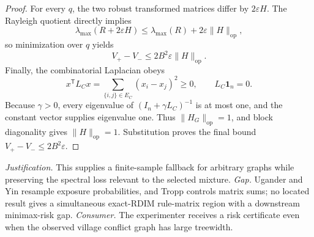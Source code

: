 \documentclass{article}
\begin{document}
\begin{proof}
For every \(q\), the two robust transformed matrices differ by \(2\varepsilon H\).  The Rayleigh quotient directly implies
\[
 \lambda_{\max}(R+2\varepsilon H)
 \le\lambda_{\max}(R)+2\varepsilon\|H\|_{\mathrm{op}},
\]
so minimization over \(q\) yields
\[
 V_+-V_-
 \le2B^2\varepsilon\|H\|_{\mathrm{op}}.
\]
Finally, the combinatorial Laplacian obeys
\[
 x^{\mathsf T}L_Cx=\sum_{\{i,j\}\in E_C}(x_i-x_j)^2\ge0,
 \qquad L_C\mathbf 1_n=0.
\]
Because \(\gamma>0\), every eigenvalue of \((I_n+\gamma L_C)^{-1}\) is at most one, and the constant vector supplies eigenvalue one.  Thus \(\|H_G\|_{\mathrm{op}}=1\), and block diagonality gives \(\|H\|_{\mathrm{op}}=1\).  Substitution proves the final bound \(V_+-V_-\le2B^2\varepsilon\).
\end{proof}
\par\smallskip\noindent \textit{Justification.} This supplies a finite-sample fallback for arbitrary graphs while preserving the spectral loss relevant to the selected mixture. \textit{Gap.} Ugander and Yin resample exposure probabilities, and Tropp controls matrix sums; no located result gives a simultaneous exact-RDIM rule-matrix region with a downstream minimax-risk gap. \textit{Consumer.} The experimenter receives a risk certificate even when the observed village conflict graph has large treewidth.
\end{document}
